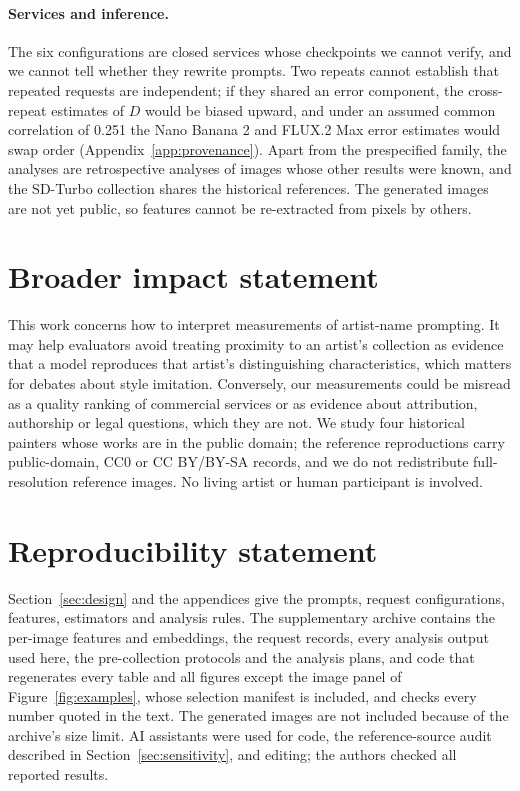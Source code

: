 \documentclass[10pt]{article}
\begin{document}
\paragraph{Services and inference.} The six configurations are closed services whose checkpoints
we cannot verify, and we cannot tell whether they rewrite prompts. Two repeats cannot establish that
repeated requests are independent; if they shared an error component, the cross-repeat estimates of
$D$ would be biased upward, and under an assumed common correlation of 0.251 the Nano Banana 2 and
FLUX.2 Max error estimates would swap order (Appendix~\ref{app:provenance}). Apart from the
prespecified family, the analyses are retrospective analyses of images whose other results were
known, and the SD-Turbo collection shares the historical references. The generated images are not
yet public, so features cannot be re-extracted from pixels by others.

\section*{Broader impact statement}
This work concerns how to interpret measurements of artist-name prompting. It may help evaluators
avoid treating proximity to an artist's collection as evidence that a model reproduces that artist's
distinguishing characteristics, which matters for debates about style imitation. Conversely, our
measurements could be misread as a quality ranking of commercial services or as evidence about
attribution, authorship or legal questions, which they are not. We study four historical painters
whose works are in the public domain; the reference reproductions carry public-domain, CC0 or CC
BY/BY-SA records, and we do not redistribute full-resolution reference images. No living artist or
human participant is involved.

\section*{Reproducibility statement}
Section~\ref{sec:design} and the appendices give the prompts, request configurations, features,
estimators and analysis rules. The supplementary archive contains the per-image features and
embeddings, the request records, every analysis output used here, the pre-collection protocols and
the analysis plans, and code that regenerates every table and all figures except the image panel of
Figure~\ref{fig:examples}, whose selection manifest is included, and checks every number quoted in
the text. The generated images are not included because of the archive's size limit. AI assistants
were used for code, the reference-source audit described in Section~\ref{sec:sensitivity}, and
editing; the authors checked all reported results.




\clearpage
\appendix

\end{document}
